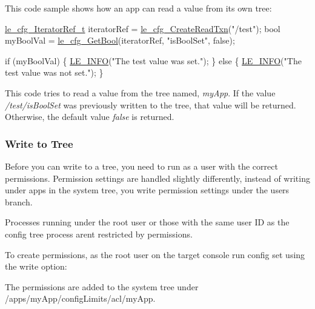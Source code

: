 This code sample shows how an app can read a value from its own tree\+:


\begin{DoxyCode}
\hyperlink{le__cfg__interface_8h_a646829934bb23a878e19ade2c3e01eba}{le\_cfg\_IteratorRef\_t} iteratorRef = \hyperlink{le__cfg__interface_8h_aa766bff3a3ddbd2769b903fc56f6d9d2}{le\_cfg\_CreateReadTxn}(\textcolor{stringliteral}{"/test"});
\textcolor{keywordtype}{bool} myBoolVal = \hyperlink{le__cfg__interface_8h_aa3898fcb0d62b03c9a238d36b42d7a63}{le\_cfg\_GetBool}(iteratorRef, \textcolor{stringliteral}{"isBoolSet"}, \textcolor{keyword}{false});

\textcolor{keywordflow}{if} (myBoolVal)
\{
    \hyperlink{le__log_8h_a23e6d206faa64f612045d688cdde5808}{LE\_INFO}(\textcolor{stringliteral}{"The test value was set."});
\}
\textcolor{keywordflow}{else}
\{
    \hyperlink{le__log_8h_a23e6d206faa64f612045d688cdde5808}{LE\_INFO}(\textcolor{stringliteral}{"The test value was not set."});
\}
\end{DoxyCode}


This code tries to read a value from the tree named, {\itshape my\+App}. If the value {\itshape /test/is\+Bool\+Set} was previously written to the tree, that value will be returned. Otherwise, the default value {\itshape false} is returned.\hypertarget{how_to_config_tree_transactions_howToConfigTree_write}{}\subsubsection{Write to Tree}\label{how_to_config_tree_transactions_howToConfigTree_write}
Before you can write to a tree, you need to run as a user with the correct permissions. Permission settings are handled slightly differently, instead of writing under apps in the system tree, you write permission settings under the user\textquotesingle{}s branch.

Processes running under the root user or those with the same user I\+D as the config tree process aren\textquotesingle{}t restricted by permissions.

To create permissions, as the root user on the target console run {\ttfamily config set} using the {\ttfamily write} option\+:




The permissions are added to the system tree under {\ttfamily /apps/my\+App/config\+Limits/acl/my\+App}.

